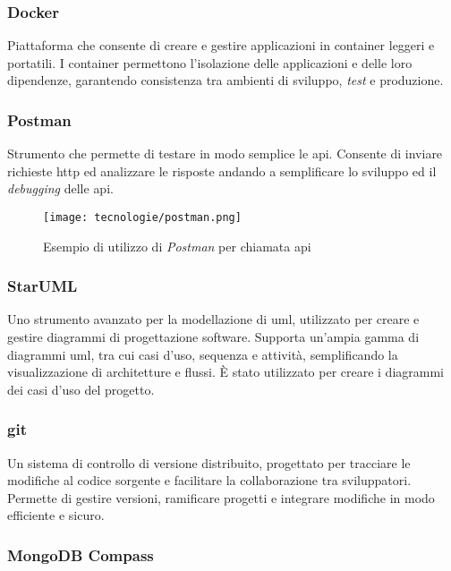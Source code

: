 \subsubsection{Docker}

Piattaforma che consente di creare e gestire applicazioni in \gls{container} leggeri e portatili.
I \gls{container} permettono l’isolazione delle applicazioni e delle loro dipendenze, garantendo consistenza tra ambienti di sviluppo, \textit{test} e produzione.

\subsubsection{Postman}

Strumento che permette di testare in modo semplice le \gls{api}. 
Consente di inviare richieste \gls{http} ed analizzare le risposte andando a semplificare lo sviluppo ed il \textit{debugging} delle \gls{api}.

\begin{figure}[H]
    \label{fig:postman}
    \centering
    \texttt{[image: tecnologie/postman.png]}
    \caption{Esempio di utilizzo di \textit{Postman} per chiamata \gls{api}}
\end{figure}

\subsubsection{StarUML}

Uno strumento avanzato per la modellazione di \gls{uml}, utilizzato per creare e gestire diagrammi di progettazione software. Supporta un'ampia gamma di diagrammi \gls{uml}, tra cui casi d'uso, sequenza e attività, semplificando la visualizzazione di architetture e flussi.
È stato utilizzato per creare i diagrammi dei casi d’uso del progetto.

\subsubsection{git}

Un sistema di controllo di versione distribuito, progettato per tracciare le modifiche al codice sorgente e facilitare la collaborazione tra sviluppatori. \\
Permette di gestire versioni, ramificare progetti e integrare modifiche in modo efficiente e sicuro. 

\pagebreak
\subsubsection{MongoDB Compass}

